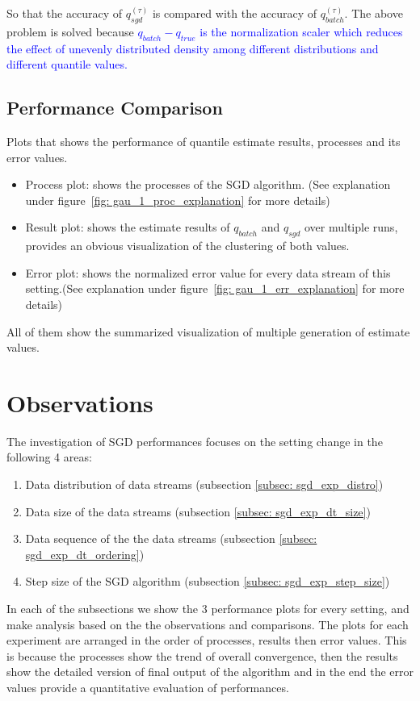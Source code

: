So that the accuracy of $q_{sgd}^{(\tau)}$ is compared with the accuracy of $q_{batch}^{(\tau)}$. The above problem is solved because 
\textcolor{blue}{
    $
    q_{batch} - q_{true}
    $
    is the normalization scaler which reduces the effect of unevenly distributed density among different distributions and different quantile values.
}

\subsection{Performance Comparison}
Plots that shows the performance of quantile estimate results, processes and its error values.

\begin{itemize}
    \item Process plot: shows the processes of the SGD algorithm. (See explanation under figure~\ref{fig: gau_1_proc_explanation} for more details)
    \item Result plot: shows the estimate results of $q_{batch}$ and $q_{sgd}$ over multiple runs, provides an obvious visualization of the clustering of both values.
    \item Error plot: shows the normalized error value for every data stream of this setting.(See explanation under figure~\ref{fig: gau_1_err_explanation} for more details)
\end{itemize}

All of them show the summarized visualization of multiple generation of estimate values.


\pagebreak
\section{Observations}
\label{sec: observations}

The investigation of SGD performances focuses on the setting change in the following 4 areas:
    \begin{enumerate}
        \item Data distribution of data streams (subsection \ref{subsec: sgd_exp_distro})
        \item Data size of the data streams (subsection \ref{subsec: sgd_exp_dt_size})
        \item Data sequence of the the data streams  (subsection \ref{subsec: sgd_exp_dt_ordering})
        \item Step size of the SGD algorithm (subsection \ref{subsec: sgd_exp_step_size})
    \end{enumerate}
In each of the subsections we show the 3 performance plots for every setting, and make analysis based on the the observations and comparisons. The plots for each experiment are arranged in the order of processes, results then error values. This is because the processes show the trend of overall convergence, then the results show the detailed version of final output of the algorithm and in the end the error values provide a quantitative evaluation of performances. 

